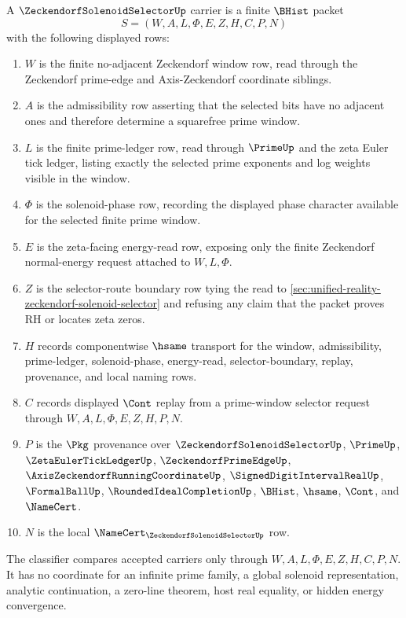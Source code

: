 \begin{definition}
\label{def:zeckendorf-solenoid-selector-carrier}
A $\ZeckendorfSolenoidSelectorUp$ carrier is a finite $\BHist$ packet
$$
S=(W,A,L,\Phi,E,Z,H,C,P,N)
$$
with the following displayed rows:
\begin{enumerate}
\item $W$ is the finite no-adjacent Zeckendorf window row, read through the
Zeckendorf prime-edge and Axis-Zeckendorf coordinate siblings.
\item $A$ is the admissibility row asserting that the selected bits have no
adjacent ones and therefore determine a squarefree prime window.
\item $L$ is the finite prime-ledger row, read through $\PrimeUp$ and the
zeta Euler tick ledger, listing exactly the selected prime exponents and log
weights visible in the window.
\item $\Phi$ is the solenoid-phase row, recording the displayed phase character
available for the selected finite prime window.
\item $E$ is the zeta-facing energy-read row, exposing only the finite
Zeckendorf normal-energy request attached to $W,L,\Phi$.
\item $Z$ is the selector-route boundary row tying the read to
\autoref{sec:unified-reality-zeckendorf-solenoid-selector} and refusing any
claim that the packet proves RH or locates zeta zeros.
\item $H$ records componentwise $\hsame$ transport for the window,
admissibility, prime-ledger, solenoid-phase, energy-read, selector-boundary,
replay, provenance, and local naming rows.
\item $C$ records displayed $\Cont$ replay from a prime-window selector request
through $W,A,L,\Phi,E,Z,H,P,N$.
\item $P$ is the $\Pkg$ provenance over $\ZeckendorfSolenoidSelectorUp$,
$\PrimeUp$, $\ZetaEulerTickLedgerUp$, $\ZeckendorfPrimeEdgeUp$,
$\AxisZeckendorfRunningCoordinateUp$, $\SignedDigitIntervalRealUp$,
$\FormalBallUp$, $\RoundedIdealCompletionUp$, $\BHist$, $\hsame$, $\Cont$,
and $\NameCert$.
\item $N$ is the local $\NameCert_{\ZeckendorfSolenoidSelectorUp}$ row.
\end{enumerate}
The classifier compares accepted carriers only through
$W,A,L,\Phi,E,Z,H,C,P,N$. It has no coordinate for an infinite prime family, a
global solenoid representation, analytic continuation, a zero-line theorem,
host real equality, or hidden energy convergence.
\end{definition}

